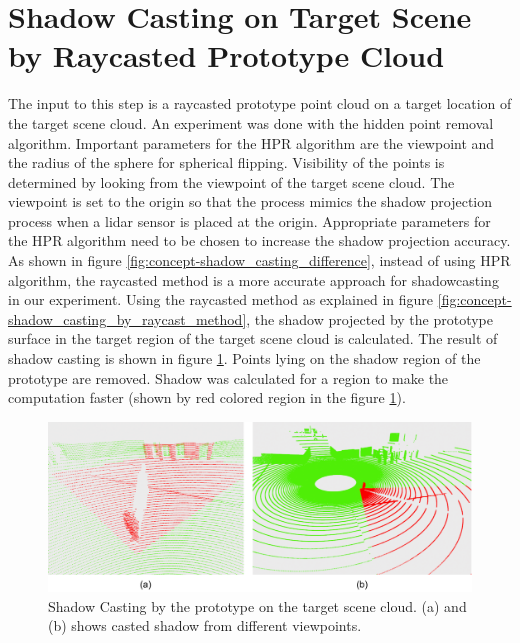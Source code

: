 \section{Shadow Casting on Target Scene by Raycasted Prototype Cloud}
The input to this step is a raycasted prototype point cloud on a target location of the target scene cloud. An experiment was done with the hidden point removal algorithm. Important parameters for the HPR algorithm are the viewpoint and the radius of the sphere for spherical flipping. Visibility of the points is determined by looking from the viewpoint of the target scene cloud. The viewpoint is set to the origin so that the process mimics the shadow projection process when a lidar sensor is placed at the origin. Appropriate parameters for the HPR algorithm need to be chosen to increase the shadow projection accuracy. As shown in figure \ref{fig:concept-shadow_casting_difference}, instead of using HPR algorithm, the raycasted method is a more accurate approach for shadowcasting in our experiment. Using the raycasted method as explained in figure \ref{fig:concept-shadow_casting_by_raycast_method}, the shadow projected by the prototype surface in the target region of the target scene cloud is calculated. The result of shadow casting is shown in figure \ref{fig:result-shadow_casting_by_prototype}. Points lying on the shadow region of the prototype are removed. Shadow was calculated for a region to make the computation faster (shown by red colored region in the figure \ref{fig:result-shadow_casting_by_prototype}).

\begin{figure}[htbp]
    \centering
    \includegraphics[width=1\linewidth]{97_graphics/results/shadow_casting_by_prototype.pdf}
    \caption{Shadow Casting by the prototype on the target scene cloud. (a) and (b) shows casted shadow from different viewpoints.}
    \label{fig:result-shadow_casting_by_prototype}
\end{figure}







 